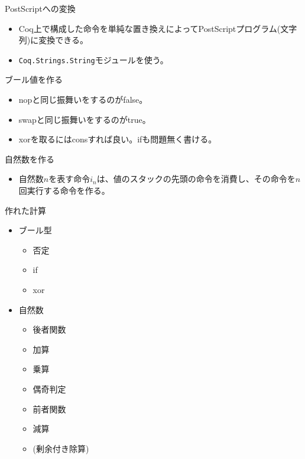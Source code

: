 \documentclass[cjk, 12pt]{beamer}
\begin{document}
\begin{frame}{PostScriptへの変換}

  \begin{itemize}
   \item Coq上で構成した命令を単純な置き換えによってPostScriptプログラム(文字列)に変換できる。
   \item \texttt{Coq.Strings.String}モジュールを使う。
  \end{itemize}

\end{frame}

\begin{frame}{ブール値を作る}

 \begin{itemize}
  \item nopと同じ振舞いをするのがfalse。
  \item swapと同じ振舞いをするのがtrue。
  \item xorを取るにはconsすれば良い。ifも問題無く書ける。
 \end{itemize}

\end{frame}

\begin{frame}{自然数を作る}

 \begin{itemize}
  \item 自然数$n$を表す命令$i_n$は、値のスタックの先頭の命令を消費し、その命令を$n$回実行する命令を作る。
 \end{itemize}

\end{frame}

\begin{frame}{作れた計算}

 \begin{itemize}
  \item ブール型
	\begin{itemize}
	 \item 否定
	 \item if
	 \item xor
	\end{itemize}
  \item 自然数
	\begin{itemize}
	 \item 後者関数
	 \item 加算
	 \item 乗算
	 \item 偶奇判定
	 \item 前者関数
	 \item 減算
	 \item (剰余付き除算)
	\end{itemize}
 \end{itemize}

\end{frame}
\end{document}
